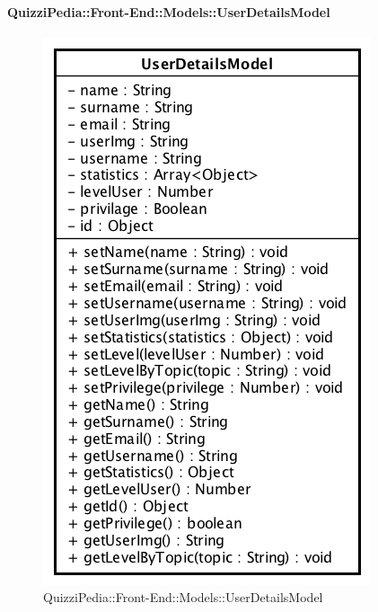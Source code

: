 \paragraph{QuizziPedia::Front-End::Models::UserDetailsModel}
		
		\label{QuizziPedia::Front-End::Models:.UserDetailsModel}
		
		\begin{figure}[ht]
			\centering
			\includegraphics[scale=0.5,keepaspectratio]{UML/Classi/Front-End/QuizziPedia_Front-end_Models_UserDetailsModel.png}
			\caption{QuizziPedia::Front-End::Models::UserDetailsModel}
		\end{figure} \FloatBarrier
		
